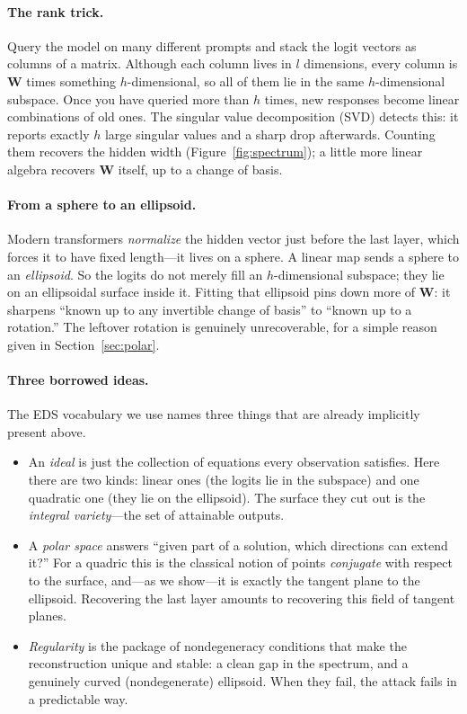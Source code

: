 \documentclass[11pt]{article}
\newcommand{\W}{\mathbf{W}}
\begin{document}
\paragraph{The rank trick.} Query the model on many different prompts and stack
the logit vectors as columns of a matrix. Although each column lives in $l$
dimensions, every column is $\W$ times something $h$-dimensional, so all of them
lie in the same $h$-dimensional subspace. Once you have queried more than $h$
times, new responses become linear combinations of old ones. The singular value
decomposition (SVD) detects this: it reports exactly $h$ large singular values
and a sharp drop afterwards. Counting them recovers the hidden width
(Figure~\ref{fig:spectrum}); a little more linear algebra recovers $\W$ itself,
up to a change of basis.

\paragraph{From a sphere to an ellipsoid.} Modern transformers
\emph{normalize} the hidden vector just before the last layer, which forces it
to have fixed length---it lives on a sphere. A linear map sends a sphere to an
\emph{ellipsoid}. So the logits do not merely fill an $h$-dimensional subspace;
they lie on an ellipsoidal surface inside it. Fitting that ellipsoid pins down
more of $\W$: it sharpens ``known up to any invertible change of basis'' to
``known up to a rotation.'' The leftover rotation is genuinely unrecoverable, for
a simple reason given in Section~\ref{sec:polar}.

\paragraph{Three borrowed ideas.} The EDS vocabulary we use names three things
that are already implicitly present above.
\begin{itemize}
\item An \emph{ideal} is just the collection of equations every observation
satisfies. Here there are two kinds: linear ones (the logits lie in the
subspace) and one quadratic one (they lie on the ellipsoid). The surface they
cut out is the \emph{integral variety}---the set of attainable outputs.
\item A \emph{polar space} answers ``given part of a solution, which directions
can extend it?'' For a quadric this is the classical notion of points
\emph{conjugate} with respect to the surface, and---as we show---it is exactly
the tangent plane to the ellipsoid. Recovering the last layer amounts to
recovering this field of tangent planes.
\item \emph{Regularity} is the package of nondegeneracy conditions that make the
reconstruction unique and stable: a clean gap in the spectrum, and a genuinely
curved (nondegenerate) ellipsoid. When they fail, the attack fails in a
predictable way.
\end{itemize}
\end{document}
